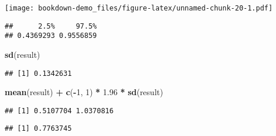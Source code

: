 \documentclass[]{book}
\newenvironment{Shaded}{\begin{snugshade}}{\end{snugshade}}
\newcommand{\CommentTok}[1]{\textcolor[rgb]{0.56,0.35,0.01}{\textit{#1}}}
\newcommand{\DecValTok}[1]{\textcolor[rgb]{0.00,0.00,0.81}{#1}}
\newcommand{\FloatTok}[1]{\textcolor[rgb]{0.00,0.00,0.81}{#1}}
\newcommand{\KeywordTok}[1]{\textcolor[rgb]{0.13,0.29,0.53}{\textbf{#1}}}
\newcommand{\NormalTok}[1]{#1}
\newcommand{\OperatorTok}[1]{\textcolor[rgb]{0.81,0.36,0.00}{\textbf{#1}}}
\newcommand{\StringTok}[1]{\textcolor[rgb]{0.31,0.60,0.02}{#1}}
\begin{document}
\texttt{[image: bookdown-demo\_files/figure-latex/unnamed-chunk-20-1.pdf]}

\begin{Shaded}
\end{Shaded}

\begin{verbatim}
##      2.5%     97.5% 
## 0.4369293 0.9556859
\end{verbatim}

\begin{Shaded}
\begin{Highlighting}[]
\KeywordTok{sd}\NormalTok{(result)}
\end{Highlighting}
\end{Shaded}

\begin{verbatim}
## [1] 0.1342631
\end{verbatim}

\begin{Shaded}
\begin{Highlighting}[]
\KeywordTok{mean}\NormalTok{(result) }\OperatorTok{+}\StringTok{ }\KeywordTok{c}\NormalTok{(}\OperatorTok{-}\DecValTok{1}\NormalTok{, }\DecValTok{1}\NormalTok{) }\OperatorTok{*}\StringTok{ }\FloatTok{1.96} \OperatorTok{*}\StringTok{ }\KeywordTok{sd}\NormalTok{(result)}
\end{Highlighting}
\end{Shaded}

\begin{verbatim}
## [1] 0.5107704 1.0370816
\end{verbatim}

\begin{Shaded}
\end{Shaded}

\begin{verbatim}
## [1] 0.7763745
\end{verbatim}

\begin{Shaded}
\end{Shaded}
\end{document}
